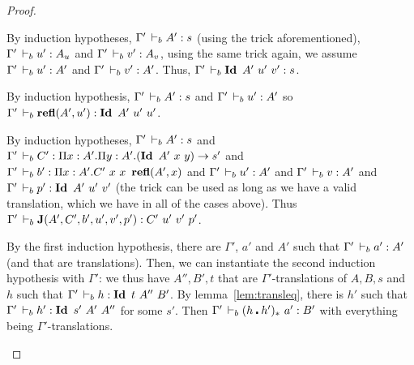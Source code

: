 \documentclass[a4paper,english]{lipics-utf8x}
\begin{document}
\begin{proof}
\begin{caselist}
      \begin{graycase}
        \begin{mathc}
        \end{mathc}
        By induction hypotheses, $\Gamma' \,\vdash_b A' : s$ (using the trick
        aforementioned), $\Gamma' \,\vdash_b u' : A_u$ and $\Gamma' \,\vdash_b v' : A_v$,
        using the same trick again, we assume $\Gamma' \,\vdash_b u' : A'$ and
        $\Gamma' \,\vdash_b v' : A'$.
        Thus, $\Gamma' \,\vdash_b \operatorname{\mathbf{Id}~} A'\ u'\ v' : s$.
      \end{graycase}

      \begin{graycase}
        \begin{mathc}
        \end{mathc}
        By induction hypothesis, $\Gamma' \,\vdash_b A' : s$ and
        $\Gamma' \,\vdash_b u' : A'$ so
        $\Gamma' \derb \refl(A',u') : \Id A'\ u'\ u'$.
      \end{graycase}

      \begin{graycase}
        \begin{mathc}
        \end{mathc}
        By induction hypotheses, $\Gamma' \,\vdash_b A' : s$ and
        $\Gamma' \,\vdash_b C' : \Pi x:A'. \Pi y:A'. (\operatorname{\mathbf{Id}~} A'\ x\ y) \to s'$ and
        $\Gamma' \derb b' : \Pi x:A'. C'\ x\ x\ \refl(A',x)$ and
        $\Gamma' \,\vdash_b u' : A'$ and $\Gamma' \,\vdash_b v : A'$ and
        $\Gamma' \,\vdash_b p' : \operatorname{\mathbf{Id}~} A'\ u'\ v'$ (the trick can be used as long as we
        have a valid translation, which we have in all of the cases above).
        Thus $\Gamma' \,\vdash_b \operatorname{\mathbf{J}}(A',C',b',u',v',p') : C'\ u'\ v'\ p'$.
      \end{graycase}

      \nextcase
      \begin{mathc}
      \end{mathc}
      By the first induction hypothesis, there are $\Gamma'$, $a'$ and $A'$
      such that $\Gamma' \,\vdash_b a' : A'$ (and that are translations).
      Then, we can instantiate the second induction hypothesis with $\Gamma'$:
      we thus have $A'',B',t$ that are $\Gamma'$-translations of $A,B,s$ and
      $h$ such that $\Gamma' \derb h : \Id t\ A''\ B'$.
      By lemma~\ref{lem:transleq}, there is $h'$ such that
      $\Gamma' \derb h' : \Id s'\ A'\ A''$ for some $s'$.
      Then $\Gamma' \,\vdash_b (h \centerdot h')_*\ a' : B'$ with everything being
      $\Gamma'$-translations.


\end{caselist}
\end{proof}
\end{document}
